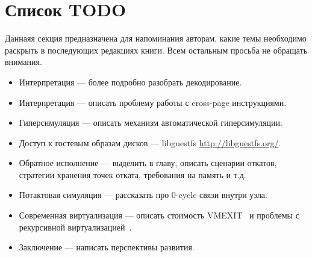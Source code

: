 \section*{Список TODO}

Даннаяя секция предназначена для напоминания авторам, какие темы необходимо раскрыть в последующих редакциях книги. Всем остальным просьба не обращать внимания.

\begin{itemize}
    \item Интерпретация --- более подробно разобрать декодирование.
    \item Интерпретация --- описать проблему работы с cross-page инструкциями.
    
    \item Гиперсимуляция --- описать механизм автоматической гиперсимуляции.
    \item Доступ к гостевым образам дисков --- libguestfs \url{http://libguestfs.org/}.
    \item Обратное исполнение --- выделить в главу, описать сценарии откатов, стратегии хранения точек отката, требования на память и т.д.
    \item Потактовая симуляция --- рассказать про 0-cycle связи внутри узла.
    \item Современная виртуализация --- описать стоимость VMEXIT~\cite{Agesen:2012:STA:2342821.2342856} и проблемы с рекурсивной виртуализацией~\cite{recursive-virt-poon}.
    \item Заключение --- написать перспективы развития.
\end{itemize}
